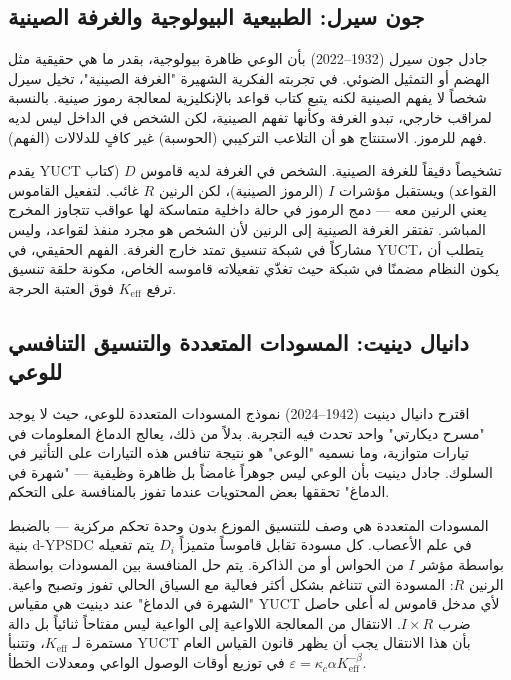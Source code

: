 \documentclass[12pt,a4paper]{article}
\begin{document}
	\subsection{جون سيرل: الطبيعية البيولوجية والغرفة الصينية}
	
	جادل جون سيرل (1932–2022) بأن الوعي ظاهرة بيولوجية، بقدر ما هي حقيقية مثل الهضم أو التمثيل الضوئي. في تجربته الفكرية الشهيرة "الغرفة الصينية"، تخيل سيرل شخصاً لا يفهم الصينية لكنه يتبع كتاب قواعد بالإنكليزية لمعالجة رموز صينية. بالنسبة لمراقب خارجي، تبدو الغرفة وكأنها تفهم الصينية، لكن الشخص في الداخل ليس لديه فهم للرموز. الاستنتاج هو أن التلاعب التركيبي (الحوسبة) غير كافٍ للدلالات (الفهم).
	
	يقدم YUCT تشخيصاً دقيقاً للغرفة الصينية. الشخص في الغرفة لديه قاموس \(D\) (كتاب القواعد) ويستقبل مؤشرات \(I\) (الرموز الصينية)، لكن الرنين \(R\) غائب. لتفعيل القاموس يعني الرنين معه — دمج الرموز في حالة داخلية متماسكة لها عواقب تتجاوز المخرج المباشر. تفتقر الغرفة الصينية إلى الرنين لأن الشخص هو مجرد منفذ لقواعد، وليس مشاركاً في شبكة تنسيق تمتد خارج الغرفة. الفهم الحقيقي، في YUCT، يتطلب أن يكون النظام مضمنًا في شبكة حيث تغذّي تفعيلاته قاموسه الخاص، مكونة حلقة تنسيق ترفع \(K_{\mathrm{eff}}\) فوق العتبة الحرجة.
	
	\subsection{دانيال دينيت: المسودات المتعددة والتنسيق التنافسي للوعي}
	
	اقترح دانيال دينيت (1942–2024) نموذج المسودات المتعددة للوعي، حيث لا يوجد "مسرح ديكارتي" واحد تحدث فيه التجربة. بدلاً من ذلك، يعالج الدماغ المعلومات في تيارات متوازية، وما نسميه "الوعي" هو نتيجة تنافس هذه التيارات على التأثير في السلوك. جادل دينيت بأن الوعي ليس جوهراً غامضاً بل ظاهرة وظيفية — "شهرة في الدماغ" تحققها بعض المحتويات عندما تفوز بالمنافسة على التحكم.
	
	المسودات المتعددة هي وصف للتنسيق الموزع بدون وحدة تحكم مركزية — بالضبط بنية d-YPSDC في علم الأعصاب. كل مسودة تقابل قاموساً متميزاً \(D_i\) يتم تفعيله بواسطة مؤشر \(I\) من الحواس أو من الذاكرة. يتم حل المنافسة بين المسودات بواسطة الرنين \(R\): المسودة التي تتناغم بشكل أكثر فعالية مع السياق الحالي تفوز وتصبح واعية. "الشهرة في الدماغ" عند دينيت هي مقياس YUCT لأي مدخل قاموس له أعلى حاصل ضرب \(I \times R\). الانتقال من المعالجة اللاواعية إلى الواعية ليس مفتاحاً ثنائياً بل دالة مستمرة لـ \(K_{\mathrm{eff}}\)، وتتنبأ YUCT بأن هذا الانتقال يجب أن يظهر قانون القياس العام \(\varepsilon = \kappa_c \alpha K_{\mathrm{eff}}^{-\beta}\) في توزيع أوقات الوصول الواعي ومعدلات الخطأ.
	
\end{document}
